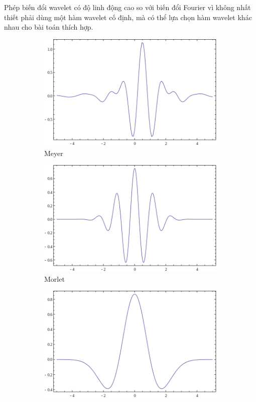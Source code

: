 Phép biến đổi wavelet có độ linh động cao so với biến đổi Fourier vì không nhất thiết phải dùng một hàm wavelet cố định, mà có thể lựa chọn hàm wavelet khác nhau cho bài toán thích hợp. 

\begin{figure} [ht]
	\begin{subfigure}{0.3\textwidth}
		\centering
		\captionsetup{justification=centering}
		\includegraphics [width=\textwidth] {Image/meyer}
		\caption{Meyer}
	\end{subfigure}
	\hfill
	\begin{subfigure}{0.3\textwidth}
		\centering
		\captionsetup{justification=centering}
		\includegraphics [width=\textwidth] {Image/morlet}
		\caption{Morlet}
	\end{subfigure}
	\hfill
	\begin{subfigure}{0.3\textwidth}
		\centering
		\captionsetup{justification=centering}
		\includegraphics [width=\textwidth] {Image/mexh}

\end{subfigure}
\end{figure}
